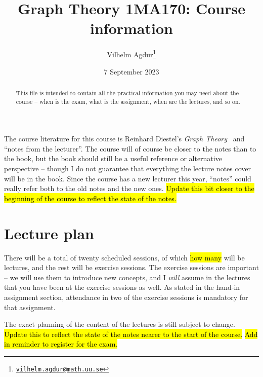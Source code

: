 \documentclass{tufte-handout}
\title{Graph Theory 1MA170: Course information}
\author[Vilhelm Agdur]{Vilhelm Agdur\thanks{\href{mailto:vilhelm.agdur@math.uu.se}{\nolinkurl{vilhelm.agdur@math.uu.se}}}}
\date{7 September 2023}
\begin{document}
\maketitle%

\begin{abstract}
\noindent
This file is intended to contain all the practical information you may need about the course -- when is the exam, what is the assignment, when are the lectures, and so on.
\end{abstract}

The course literature for this course is Reinhard Diestel's \emph{Graph Theory}~\cite{Diestel_course_book} and ``notes from the lecturer''. The course will of course be closer to the notes than to the book, but the book should still be a useful reference or alternative perspective -- though I do not guarantee that everything the lecture notes cover will be in the book. Since the course has a new lecturer this year, ``notes'' could really refer both to the old notes and the new ones. \hl{Update this bit closer to the beginning of the course to reflect the state of the notes.}

\section{Lecture plan}

There will be a total of twenty scheduled sessions, of which \hl{how many} will be lectures, and the rest will be exercise sessions. The exercise sessions are important -- we will use them to introduce new concepts, and I \emph{will} assume in the lectures that you have been at the exercise sessions as well. As stated in the hand-in assignment section, attendance in two of the exercise sessions is mandatory for that assignment.

The exact planning of the content of the lectures is still subject to change. \hl{Update this to reflect the state of the notes nearer to the start of the course.} \hl{Add in reminder to register for the exam.}
\end{document}
